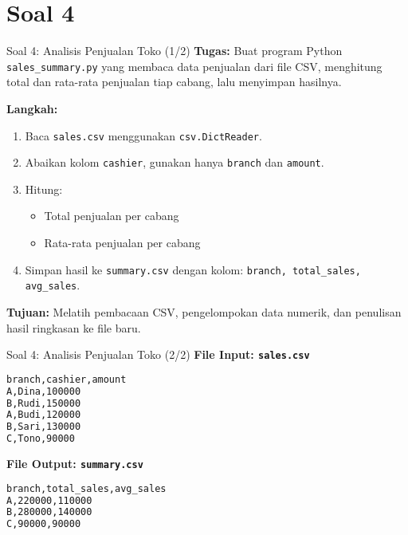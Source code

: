 \documentclass[aspectratio=169, table]{beamer}
\begin{document}
\section{Soal 4}
\begin{frame}[fragile]{Soal 4: Analisis Penjualan Toko (1/2)}
\vspace{15pt}
\textbf{Tugas:}  
Buat program Python \texttt{sales\_summary.py} yang membaca data penjualan dari file CSV, menghitung total dan rata-rata penjualan tiap cabang, lalu menyimpan hasilnya.

\textbf{Langkah:}
\begin{enumerate}
  \item Baca \texttt{sales.csv} menggunakan \texttt{csv.DictReader}.
  \item Abaikan kolom \texttt{cashier}, gunakan hanya \texttt{branch} dan \texttt{amount}.
  \item Hitung:
        \begin{itemize}
          \item Total penjualan per cabang
          \item Rata-rata penjualan per cabang
        \end{itemize}
  \item Simpan hasil ke \texttt{summary.csv} dengan kolom:  
        \texttt{branch, total\_sales, avg\_sales}.
\end{enumerate}
\textbf{Tujuan:}  
Melatih pembacaan CSV, pengelompokan data numerik, dan penulisan hasil ringkasan ke file baru.
\end{frame}

\begin{frame}[fragile]{Soal 4: Analisis Penjualan Toko (2/2)}
\vspace{15pt}
\textbf{File Input: \texttt{sales.csv}}
\begin{lstlisting}[language=bash,basicstyle=\ttfamily\small]
branch,cashier,amount
A,Dina,100000
B,Rudi,150000
A,Budi,120000
B,Sari,130000
C,Tono,90000
\end{lstlisting}

\textbf{File Output: \texttt{summary.csv}}
\begin{lstlisting}[language=bash,basicstyle=\ttfamily\small]
branch,total_sales,avg_sales
A,220000,110000
B,280000,140000
C,90000,90000
\end{lstlisting}
\end{frame}
\end{document}
